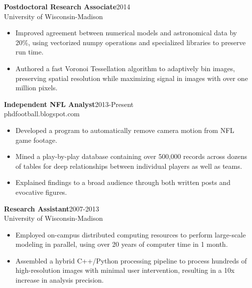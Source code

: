 \documentclass[11pt]{res}
\begin{document}
\begin{resume}
{\bf Postdoctoral Research Associate}\hfill\mbox{2014}\\
University of Wisconsin-Madison
                  \vspace* {0.01 in}\begin{itemize} \itemsep -2pt
                    \item Improved agreement between numerical models
                      and astronomical data by 20\%, using vectorized
                      numpy operations and specialized libraries to
                      preserve run time.
                    \item Authored a fast Voronoi Tessellation algorithm
                      to adaptively bin images, preserving spatial
                      resolution while maximizing signal in images
                      with over one million pixels.
                    \end{itemize}
\vspace{-0.15in}
{\bf Independent NFL Analyst}\hfill\mbox{2013-Present}\\
phdfootball.blogspot.com
                  \vspace* {0.01 in}\begin{itemize} \itemsep -2pt
                    \item Developed a program to automatically remove
                      camera motion from NFL game footage. 
                    \item Mined a play-by-play database containing
                      over 500,000 records across dozens of tables
                      for deep relationships between individual players
                      as well as teams. 
                    \item Explained findings to a broad audience through both written posts and evocative figures.
                  \end{itemize} 
\vspace{-0.15in}
{\bf Research Assistant}\hfill\mbox{2007-2013}\\
University of Wisconsin-Madison
                  \vspace* {0.01 in}\begin{itemize} \itemsep -2pt
                   \item Employed on-campus distributed computing
                     resources to perform large-scale modeling in parallel, using over 20 years of computer time
                     in 1 month.
                   \item Assembled a hybrid C++/Python processing
                     pipeline to process hundreds of high-resolution images with
                     minimal user intervention, resulting in a 10x increase in analysis precision.

\end{itemize}
\end{resume}
\end{document}
